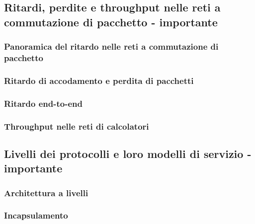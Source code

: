 \subsection{Ritardi, perdite e throughput nelle reti a commutazione di pacchetto - importante}
\subsubsection{Panoramica del ritardo nelle reti a commutazione di pacchetto}
\subsubsection{Ritardo di accodamento e perdita di pacchetti}
\subsubsection{Ritardo end-to-end} 
\subsubsection{Throughput nelle reti di calcolatori} 

\subsection{Livelli dei protocolli e loro modelli di servizio - importante} 
\subsubsection{Architettura a livelli }
\subsubsection{Incapsulamento}

